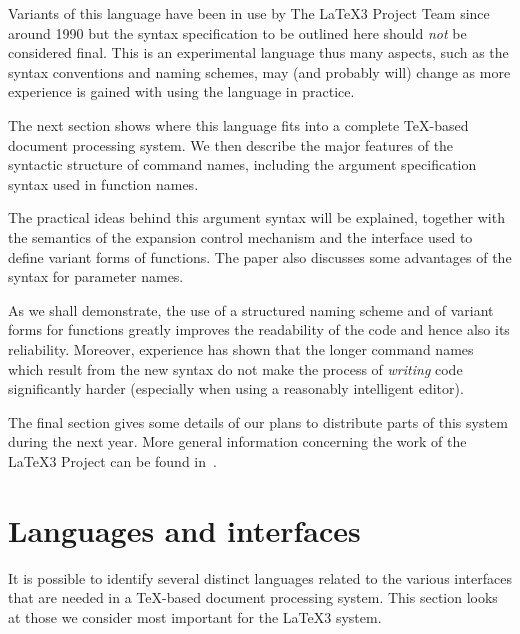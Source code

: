 \documentclass{article}
\begin{document}
Variants of this language have been in use by The \LaTeX3 Project Team
since around 1990 but the syntax specification to be outlined here
should \emph{not} be considered final. This is an experimental
language thus many aspects, such as the syntax conventions and naming
schemes, may (and probably will) change as more experience is gained
with using the language in practice.

The next section shows where this language fits into a complete
\TeX-based document processing system.  We then describe the major
features of the syntactic structure of command names, including the
argument specification syntax used in function names.

The practical ideas behind this argument syntax will be explained,
together with the semantics of the expansion control mechanism and the
interface used to define variant forms of functions.  The paper also
discusses some advantages of the syntax for parameter names.

As we shall demonstrate, the use of a structured naming scheme and of
variant forms for functions greatly improves the readability of the
code and hence also its reliability.  Moreover, experience has shown
that the longer command names which result from the new syntax do not
make the process of \emph{writing} code significantly harder
(especially when using a reasonably intelligent editor).

The final section gives some details of our plans to distribute parts
of this system during the next year.
More general information concerning the work of the \LaTeX3 Project
can be found in~\cite{tub:MR98-1}.


\section{Languages and interfaces}
\label{sec:langs}

It is possible to identify several distinct languages related to the
various interfaces that are needed in a \TeX-based document processing
system.  This section looks at those we consider most important for
the \LaTeX3 system.
\end{document}
